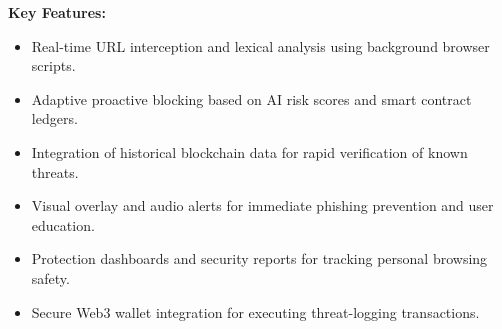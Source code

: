 \textbf{Key Features:}  
\begin{itemize}
    \item Real-time URL interception and lexical analysis using background browser scripts.
    \item Adaptive proactive blocking based on AI risk scores and smart contract ledgers.
    \item Integration of historical blockchain data for rapid verification of known threats.
    \item Visual overlay and audio alerts for immediate phishing prevention and user education.
    \item Protection dashboards and security reports for tracking personal browsing safety.
    \item Secure Web3 wallet integration for executing threat-logging transactions.
\end{itemize}